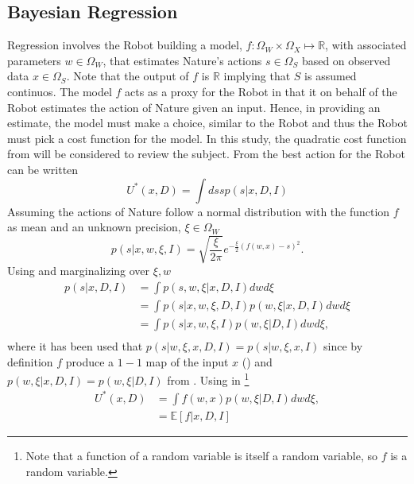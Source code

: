 \subsection{Bayesian Regression}
\label{chp:regression}
Regression involves the Robot building a model, $f: \Omega_W\times \Omega_X\mapsto\mathbb{R}$, with associated parameters $w\in \Omega_W$, that estimates Nature's actions $s\in \Omega_S$ based on observed data $x\in \Omega_S$. Note that the output of $f$ is $\mathbb{R}$ implying that $S$ is assumed continuos. The model $f$ acts as a proxy for the Robot in that it on behalf of the Robot estimates the action of Nature given an input. Hence, in providing an estimate, the model must make a choice, similar to the Robot and thus the Robot must pick a cost function for the model. In this study, the quadratic cost function from  will be considered to review the subject. From  the best action for the Robot can be written
\begin{equation}
	U^*(x,D) = \int ds s p(s|x,D,I)
	\label{eq:q1}
\end{equation}
Assuming the actions of Nature follow a normal distribution with the function $f$ as mean and an unknown precision, $\xi\in \Omega_W$
\begin{equation}
	p(s|x,w,\xi,I)=\sqrt{\frac{\xi}{2\pi}} e^{-\frac{\xi}{2}(f(w,x)-s)^2}.
	\label{f_dist}
\end{equation}
Using  and marginalizing over $\xi,w$
\begin{equation}
	\begin{split}
		p(s|x,D,I) &= \int p(s,w,\xi|x,D,I) dw d\xi\\
		& = \int p(s|x,w,\xi,D,I)  p(w,\xi|x,D,I)dw d\xi\\
		& = \int p(s|x,w,\xi,I)  p(w,\xi|D,I)dw d\xi,\\
	\end{split}
	\label{eq:q2}
\end{equation}
where it has been used that $p(s|w,\xi,x,D,I) = p(s|w,\xi,x,I)$ since by definition $f$ produce a $1-1$ map of the input $x$ () and $p(w,\xi|x,D,I) = p(w,\xi|D,I)$ from . Using  in \footnote{Note that a function of a random variable is itself a random variable, so $f$ is a random variable.}
\begin{equation}
	\begin{split}
		U^*(x,D) & = \int f(w,x)  p(w,\xi|D,I) dw d\xi,\\
		& = \mathbb{E}[f|x,D,I]
	\end{split}
	\label{eq:q3}
\end{equation}	
